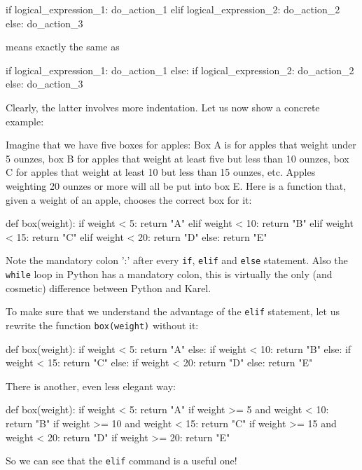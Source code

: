 \begin{bluecode}
    if logical_expression_1:
        do_action_1
    elif logical_expression_2:
        do_action_2
    else:
        do_action_3
\end{bluecode}
means exactly the same as

\begin{bluecode}
    if logical_expression_1:
        do_action_1
    else:
        if logical_expression_2:
            do_action_2
        else:
            do_action_3
\end{bluecode}
Clearly, the latter involves more indentation. Let us now show a concrete example:

Imagine that we have five boxes for apples: Box A is for apples that weight under 
5 ounzes, box B for apples that weight at least five but less than 10 ounzes, 
box C for apples that weight at least 10 but less than 15 ounzes, etc. Apples weighting 
20 ounzes or more will all be put into box E. Here is a function that, given 
a weight of an apple, chooses the correct box for it:

\begin{bluecode}
def box(weight):
    if weight < 5:
        return "A"
    elif weight < 10:
        return "B"
    elif weight < 15:
        return "C"
    elif weight < 20:
        return "D"
    else:
        return "E"
\end{bluecode}
Note the mandatory colon ':' after every {\tt if}, {\tt elif} and {\tt else} statement. Also
the {\tt while} loop in Python has a mandatory colon, this is virtually the only 
(and cosmetic) difference between Python and Karel.

To make sure that we understand the advantage of the {\tt elif} statement, let us rewrite 
the function {\tt box(weight)} without it:

\begin{bluecode}
def box(weight):
    if weight < 5:
        return "A"
    else:
        if weight < 10:
            return "B"
        else:
            if weight < 15:
                return "C"
            else:
                if weight < 20:
                    return "D"
                else:
                    return "E"
\end{bluecode}
There is another, even less elegant way:

\begin{bluecode}
def box(weight):
    if weight < 5:
        return "A"
    if weight >= 5 and weight < 10:
        return "B"
    if weight >= 10 and weight < 15:
        return "C"
    if weight >= 15 and weight < 20:
        return "D"
    if weight >= 20:
        return "E"
\end{bluecode}
So we can see that the {\tt elif} command is a useful one!

